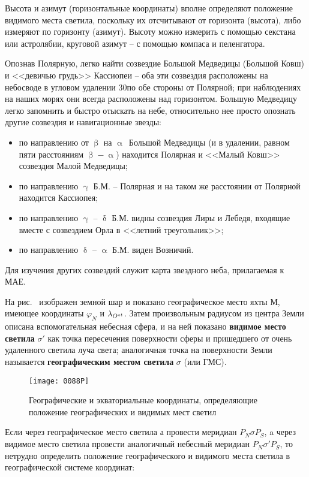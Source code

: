 Высота и азимут (горизонтальные координаты) вполне определяют положение видимого места светила, поскольку их отсчитывают от горизонта (высота), либо измеряют по горизонту (азимут). Высоту можно измерить с помощью секстана или астролябии, круговой азимут \--- с помощью компаса и пеленгатора.

Опознав Полярную, легко найти созвездие Большой Медведицы (Большой Ковш) и <<девичью грудь>> Кассиопеи \--- оба эти созвездия расположены на небосводе в угловом удалении 30\gr по обе стороны от Полярной; при наблюдениях на наших морях они всегда расположены над горизонтом. Большую Медведицу легко запомнить и быстро отыскать на небе, относительно нее просто опознать другие созвездия и навигационные звезды:

\begin{itemize}
\item по направлению от $\upbeta$ на $\upalpha$~Большой Медведицы (и в удалении, равном пяти расстояниям $\upbeta - \upalpha$) находится Полярная и <<Малый Ковш>> созвездия Малой Медведицы; 
\item по направлению $\upgamma$ Б.М. \--- Полярная и на таком же расстоянии от Полярной находится Кассиопея; 
\item по направлению $\upgamma$ \--- $\updelta$ Б.М. видны созвездия Лиры и Лебедя, входящие вместе с созвездием Орла в <<летний треугольник>>; 
\item по направлению $\updelta$ \--- $\upalpha$ Б.М. виден Возничий. 
\end{itemize}

Для изучения других созвездий служит карта звездного неба, прилагаемая к МАЕ.

На рис.~ изображен земной шар и показано географическое место яхты $М$, имеющее координаты $\varphi_N$ и $\lambda_{O^{st}}$. Затем произвольным радиусом из центра Земли описана вспомогательная небесная сфера, и на ней показано \textbf{видимое место светила}  $\sigma'$ как точка пересечения поверхности сферы и пришедшего от очень удаленного светила луча света; аналогичная точка на поверхности Земли называется \textbf{географическим местом светила} $\sigma$ (или ГМС).

\begin{figure}[htb]
  \centering{}
  \texttt{[image: 0088P]}
  \caption{Географические и экваториальные координаты, определяющие положение географических и видимых мест светил}
  \label{fig:88}
\end{figure}

Если через географическое место светила а провести меридиан $P_N \sigma P_S$, a через видимое место светила провести аналогичный небесный меридиан $P_N \sigma' P_S$, то нетрудно определить положение географического и видимого места светила в географической системе координат:

